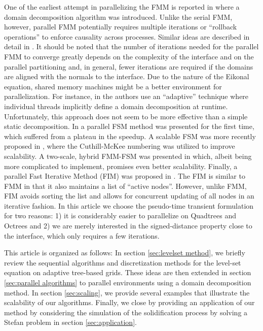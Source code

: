 One of the earliest attempt in parallelizing the FMM is reported in \cite{Herrmann:03:A-domain-decompositi} where a domain decomposition algorithm was introduced. Unlike the serial FMM, however, parallel FMM potentially requires multiple iterations or ``rollback operations'' to enforce causality across processes. Similar ideas are described in detail in \cite{Tugurlan:08:Fast-marching-method}. It should be noted that the number of iterations needed for the parallel FMM to converge greatly depends on the complexity of the interface and on the parallel partitioning and, in general, fewer iterations are required if the domains are aligned with the normals to the interface. Due to the nature of the Eikonal equation, shared memory machines might be a better environment for parallelization. For instance, in \cite{Breus;Cristiani;Gwosdek;etal:11:An-adaptive-domain-d} the authors use an ``adaptive'' technique where individual threads implicitly define a domain decomposition at runtime. Unfortunately, this approach does not seem to be more effective than a simple static decomposition. In \cite{Zhao:07:Parallel-implementat} a parallel FSM method was presented for the first time, which suffered from a plateau in the speedup. A scalable FSM was more recently proposed in \cite{Detrixhe;Gibou;Min:13:A-parallel-fast-swee}, where the Cuthill-McKee numbering was utilized to improve scalability.  A two-scale, hybrid FMM-FSM was presented in \cite{Chacon;Vladimirsky:13:A-parallel-Heap-Cell} which, albeit being more complicated to implement, promises even better scalability. Finally, a parallel Fast Iterative Method (FIM) was proposed in \cite{Jeong;Whitaker:08:A-fast-iterative-met}. The FIM is similar to FMM in that it also maintains a list of ``active nodes''. However, unlike FMM, FIM avoids sorting the list and allows for concurrent updating of all nodes in an iterative fashion. In this article we choose the pseudo-time transient formulation for two reasons: 1) it is considerably easier to parallelize on Quadtrees and Octrees and 2) we are merely interested in the signed-distance property close to the interface, which only requires a few iterations.

This article is organized as follows: In section \ref{sec:levelset method}, we briefly review the sequential algorithms and discretization methods for the level-set equation on adaptive tree-based grids. These ideas are then extended in section \ref{sec:parallel algorithms} to parallel environments using a domain decomposition method. In section \ref{sec:scaling}, we provide several examples that illustrate the scalability of our algorithms. Finally, we close by providing an application of our method by considering the simulation of the solidification process by solving a Stefan problem in section \ref{sec:application}.
